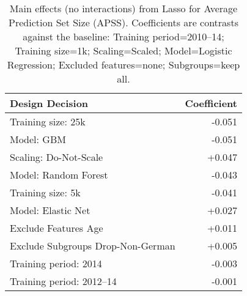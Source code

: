\begin{table}
\centering
\caption{Main effects (no interactions) from Lasso for Average Prediction Set Size (APSS). Coefficients are contrasts against the baseline: Training period=2010–14; Training size=1k; Scaling=Scaled; Model=Logistic Regression; Excluded features=none; Subgroups=keep all. }
\label{tab:main_effects_apss}
\begin{tabular}{l r}
\toprule
                  Design Decision & Coefficient \\
\midrule
               Training size: 25k &      -0.051 \\
                       Model: GBM &      -0.051 \\
            Scaling: Do-Not-Scale &      +0.047 \\
             Model: Random Forest &      -0.043 \\
                Training size: 5k &      -0.041 \\
               Model: Elastic Net &      +0.027 \\
             Exclude Features Age &      +0.011 \\
Exclude Subgroups Drop-Non-German &      +0.005 \\
            Training period: 2014 &      -0.003 \\
         Training period: 2012–14 &      -0.001 \\
\bottomrule
\end{tabular}
\end{table}
